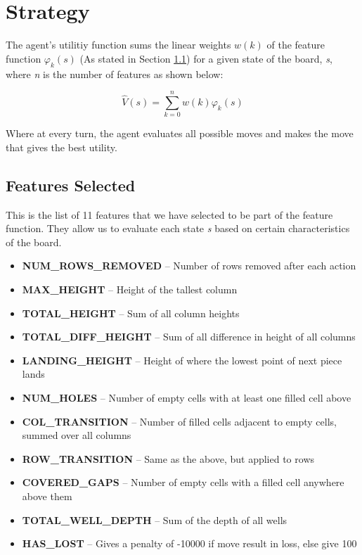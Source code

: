 \documentclass[a4paper,12pt,twocolumn]{article}
\begin{document}

\section{Strategy}
The agent's utilitiy function sums the linear weights $w(k)$ of the feature function $\varphi_k(s)$
(As stated in Section \ref{features_subsection}) for a given state of the board,
\textit{s}, where \textit{n} is the number of features as shown below:

\[
    \hat V(s) = \sum_{k=0}^{n}w(k)\varphi_k(s)
\]

Where at every turn, the agent evaluates all possible moves and makes the move
that gives the best utility.

\subsection{Features Selected}
\label{features_subsection}
This is the list of 11 features that we have selected to be part of the feature function.
They allow us to evaluate each state \textit{s} based on certain characteristics of the board.

\begin{itemize}
    \itemsep0em
    \item \textbf{NUM\_ROWS\_REMOVED} -- Number of rows removed after each action
    \item \textbf{MAX\_HEIGHT} -- Height of the tallest column
    \item \textbf{TOTAL\_HEIGHT} -- Sum of all column heights
    \item \textbf{TOTAL\_DIFF\_HEIGHT} -- Sum of all difference in height of all columns
    \item \textbf{LANDING\_HEIGHT} -- Height of where the lowest point of next piece lands
    \item \textbf{NUM\_HOLES} -- Number of empty cells with at least one filled cell above
    \item \textbf{COL\_TRANSITION} -- Number of filled cells adjacent to empty cells,
        summed over all columns
    \item \textbf{ROW\_TRANSITION} -- Same as the above, but applied to rows
    \item \textbf{COVERED\_GAPS} -- Number of empty cells with a filled cell
        anywhere above them
    \item \textbf{TOTAL\_WELL\_DEPTH} -- Sum of the depth of all wells
    \item \textbf{HAS\_LOST} -- Gives a penalty of -10000 if move result in loss,
        else give 100
\end{itemize}
\end{document}
